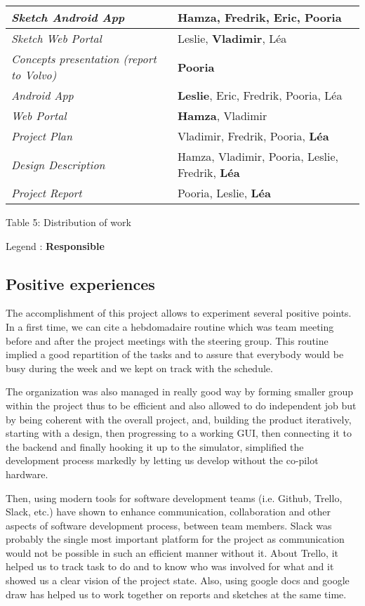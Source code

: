 \documentclass{article}
\begin{document}
\begin{center}
\begin{tabular}{|l|l|}
\hline
\textit{Sketch Android App} & Hamza, \textbf{Fredrik}, Eric, Pooria \\ \hline
\textit{Sketch Web Portal} & Leslie, \textbf{Vladimir}, L\'ea \\ \hline
\textit{Concepts presentation (report to Volvo)} & \textbf{Pooria} \\ \hline
\textit{Android App} & \textbf{Leslie}, Eric, Fredrik, Pooria, L\'ea \\ \hline
\textit{Web Portal} & \textbf{Hamza}, Vladimir \\ \hline
\textit{Project Plan} & Vladimir, Fredrik, Pooria, \textbf{L\'ea} \\ \hline
\textit{Design Description} & Hamza, Vladimir, Pooria, Leslie, Fredrik, \textbf{L\'ea} \\ \hline
\textit{Project Report} & Pooria, Leslie, \textbf{L\'ea} \\ \hline
\end{tabular}

\end{center}
\begin{center}
\caption{Table 5: Distribution of work}
\end{center}
Legend : \textbf{Responsible}

\subsection{Positive experiences}

The accomplishment of this project allows to experiment several positive points. In a first time, we can cite a hebdomadaire routine which was team meeting before and after the project meetings with the steering group. This routine implied a good repartition of the tasks and to assure that everybody would be busy during the week and we kept on track with the schedule. 

The organization was also managed in really good way by forming smaller group within the project thus to be efficient and also allowed to do independent job but by being coherent with the overall project, and, building the product iteratively, starting with a design, then progressing to a working GUI, then connecting it to the backend and finally hooking it up to the simulator, simplified the development process markedly by letting us develop without the co-pilot hardware.

Then, using modern tools for software development teams (i.e. Github, Trello, Slack, etc.) have shown to enhance communication, collaboration and other aspects of software development process, between team members. Slack was probably the single most important platform for the project as communication would not be possible in such an efficient manner without it. About Trello, it helped us to track task to do and to know who was involved for what and it showed us a clear vision of the project state. Also, using google docs and google draw has helped us to work together on reports and sketches at the same time.
\end{document}
